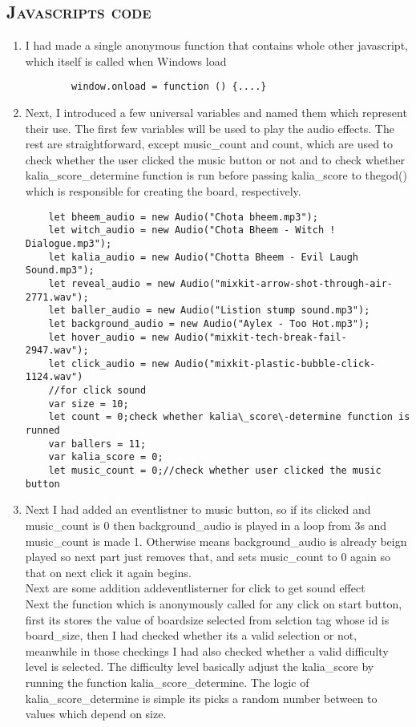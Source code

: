 \documentclass{article}
\begin{document}
\begin{flushleft}
\section{\textsc{Javascripts code}}
    \begin{enumerate}
    \item
    I had made a single anonymous function that contains whole other javascript, which itself is called when Windows load
    \begin{verbatim}
        window.onload = function () {....}
    \end{verbatim}
    \item 
    Next, I introduced a few universal variables and named them which represent their use. The first few variables will be used to play the audio effects. The rest are straightforward, except music\_count and count, which are used to check whether the user clicked the music button or not and to check whether kalia\_score\_determine function is run before passing kalia\_score to thegod() which is responsible for creating the board, respectively.
    \begin{verbatim}
    let bheem_audio = new Audio("Chota bheem.mp3");
    let witch_audio = new Audio("Chota Bheem - Witch ! Dialogue.mp3");
    let kalia_audio = new Audio("Chotta Bheem - Evil Laugh Sound.mp3");
    let reveal_audio = new Audio("mixkit-arrow-shot-through-air-2771.wav");
    let baller_audio = new Audio("Listion stump sound.mp3");
    let background_audio = new Audio("Aylex - Too Hot.mp3");
    let hover_audio = new Audio("mixkit-tech-break-fail-  2947.wav");
    let click_audio = new Audio("mixkit-plastic-bubble-click-1124.wav")
    //for click sound
    var size = 10;
    let count = 0;check whether kalia\_score\-determine function is runned
    var ballers = 11;
    var kalia_score = 0;
    let music_count = 0;//check whether user clicked the music button
    \end{verbatim}
    \item 
    Next I had added an eventlistner to music button, so if its clicked and music\_count is 0 then background\_audio is played in a loop from 3s and music\_count is made 1. Otherwise means background\_audio is already beign played so next part just removes that, and sets music\_count to 0 again so that on next click it again begins.\\
    Next are some addition addeventlisterner for click to get sound effect\\
    Next the function which is anonymously called for any click on start button, first its stores the value of boardsize selected from selction tag whose id is board\_size, then I had checked whether its a valid selection or not, meanwhile in those checkings I had also checked whether a valid difficulty level is selected. The difficulty level basically adjust the kalia\_score by running the function kalia\_score\_determine. The logic of kalia\_score\_determine is simple its picks a random number between to values which depend on size.\\

\end{enumerate}
\end{flushleft}
\end{document}
